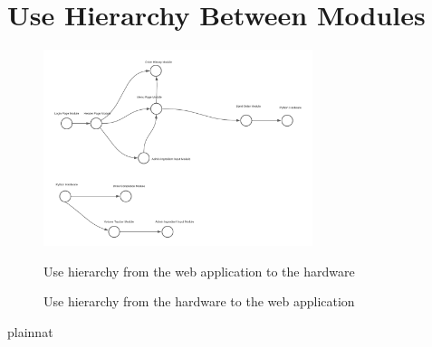 \documentclass[12pt, titlepage]{article}
\begin{document}
\section{Use Hierarchy Between Modules} \label{SecUse}



\begin{figure}[H]
\centering
\includegraphics[width=0.7\textwidth]{Blank board.png}
\caption{Use hierarchy from the web application to the hardware}
\caption{Use hierarchy from the hardware to the web application}
\label{FigUH}
\end{figure}


 {plainnat}

\end{document}
